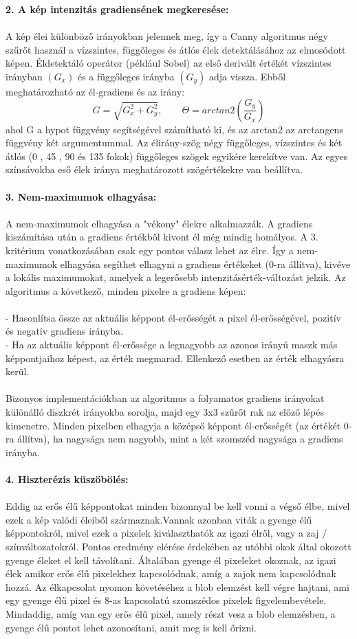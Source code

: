 \textbf{2. A kép intenzitás gradiensének megkeresése:}\\ \\
A kép élei különböző irányokban jelennek meg, így a Canny algoritmus négy szűrőt használ a vízszintes, függőleges és átlós élek detektálásához az elmosódott képen. Éldetektáló operátor (például Sobel) az első derivált értékét vízszintes irányban $(G_x)$ és a függőleges irányba $(G_y)$ adja vissza. Ebből meghatározható az él-gradiens és az irány:
$$G=\sqrt{G_{x}^{2}+G_{y}^{2}},\qquad \Theta =arctan2(\frac{G_y}{G_x})$$
ahol G a hypot függvény segítségével számítható ki, és az arctan2 az arctangens függvény két argumentummal.
Az élirány-szög négy függőleges, vízszintes és két átlós (0 , 45 , 90  és 135 fokok) függőleges szögek egyikére kerekítve van. Az egyes színsávokba eső élek iránya meghatározott szögértékekre van beállítva.
\\ \\
\textbf{3. Nem-maximumok elhagyása:}\\ \\
A nem-maximumok elhagyása a "vékony" élekre alkalmazzák. A gradiens kiszámítása után a gradiens értékből kivont él még mindig homályos. A 3. kritérium vonatkozásában csak egy pontos válasz lehet az élre. Így a nem-maximumok elhagyása segíthet elhagyni a gradiens értékeket (0-ra állítva), kivéve a lokális maximumokat, amelyek a legerősebb intenzitásérték-változást jelzik. Az algoritmus a következő, minden pixelre a gradiens képen: \\ \\
\indent - Hasonlítsa össze az aktuális képpont él-erősségét a pixel él-erősségével, pozitív és negatív gradiens irányba.\\
\indent - Ha az aktuális képpont él-erőssége a legnagyobb az azonos irányú maszk más képpontjaihoz képest, az érték megmarad. Ellenkező esetben az érték elhagyásra kerül.\\ 
\\
Bizonyos implementációkban az algoritmus a folyamatos gradiens irányokat különálló diszkrét irányokba sorolja, majd egy 3x3 szűrőt rak az előző lépés kimenetre. Minden pixelben elhagyja a középső képpont él-erősségét (az értékét 0-ra állítva), ha nagysága nem nagyobb, mint a két szomszéd nagysága a gradiens irányba.
\\ \\
\textbf{4. Hiszterézis küszöbölés:}\\ \\
Eddig az erős élű képpontokat minden bizonnyal be kell vonni a végső élbe, mivel ezek a kép valódi éleiből származnak.Vannak azonban viták a gyenge élű képpontokról, mivel ezek a pixelek kiválaszthatók az igazi élről, vagy a zaj / színváltozatokról. Pontos eredmény elérése érdekében az utóbbi okok által okozott gyenge éleket el kell távolítani. Általában gyenge él pixeleket okoznak, az igazi élek amikor erős élű pixelekhez kapcsolódnak, amíg a zajok nem kapcsolódnak hozzá. Az élkapcsolat nyomon követéséhez a blob elemzést kell végre hajtani, ami egy gyenge élű pixel és 8-as kapcsolatú szomszédos pixelek figyelembevétele. Mindaddig, amíg van egy erős élű pixel, amely részt vesz a blob elemzésben, a gyenge élű pontot lehet azonosítani, amit meg is kell őrizni.
